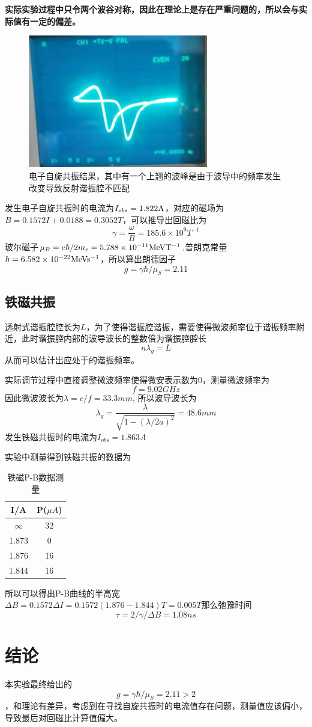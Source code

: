 \documentclass[10pt]{ctexart}
\begin{document}
\textbf{实际实验过程中只令两个波谷对称，因此在理论上是存在严重问题的，所以会与实际值有一定的偏差。}
\begin{figure}
    \centering
    \includegraphics[width=0.7\textwidth]{figure/ESR.jpg}
    \caption{电子自旋共振结果，其中有一个上翘的波峰是由于波导中的频率发生改变导致反射谐振腔不匹配}
    \label{fig:ESR}
\end{figure}
发生电子自旋共振时的电流为$I_{obs}=1.822{\rm A}$，对应的磁场为$B=0.1572I+0.0188=0.3052T$，可以推导出回磁比为
\[\gamma=\frac{\omega}{B}=185.6\times 10^{9}T^{-1}\]
玻尔磁子$\mu_B=e\hbar/2m_e=5.788\times 10^{-11}{\rm MeVT^{-1}}$,普朗克常量$\hbar=6.582\times 10^{-22}{\rm MeVs^{-1}}$，所以算出朗德因子
\[g=\gamma\hbar/\mu_S=2.11\]

\subsection{铁磁共振}
透射式谐振腔腔长为$L$，为了使得谐振腔谐振，需要使得微波频率位于谐振频率附近，此时谐振腔内部的波导波长的整数倍为谐振腔腔长
\[n\lambda_g=L\]
从而可以估计出应处于的谐振频率。

实际调节过程中直接调整微波频率使得微安表示数为0，测量微波频率为
\[f=9.02GHz\]
因此微波波长为$\lambda=c/f=33.3mm$,
所以波导波长为
\[\lambda_g=\frac{\lambda}{\sqrt{1-(\lambda/2a)^2}}=48.6mm\]
发生铁磁共振时的电流为$I_{obs}=1.863A$

实验中测量得到铁磁共振的数据为
\begin{table}
    \begin{tabular}{|c|c|}
        \textbf{I/A} & \textbf{P($\mu A$)}\\
        \hline
        $\infty$  &  32\\
    1.873   & 0\\
    1.876  &  16\\
    1.844  &  16\\
    \end{tabular}
    \centering
    \caption{铁磁P-B数据测量}
    \label{tab:FMR}
\end{table}
所以可以得出P-B曲线的半高宽$\Delta B=0.1572\Delta I=0.1572(1.876-1.844)T=0.005T$那么弛豫时间
\[\tau=2/\gamma/\Delta B=1.08ns\]
\section{结论}
本实验最终给出的\[g=\gamma\hbar/\mu_S=2.11>2\]，和理论有差异，考虑到在寻找自旋共振时的电流值存在问题，测量值应该偏小，导致最后对回磁比计算值偏大。

\end{document}
